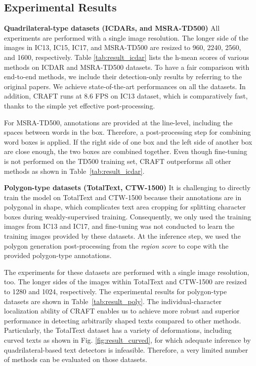\documentclass[10pt,twocolumn,letterpaper]{article}
\begin{document}
\subsection{Experimental Results}

\noindent\textbf{Quadrilateral-type datasets (ICDARs, and MSRA-TD500)} 
All experiments are performed with a single image resolution. The longer side of the images in IC13, IC15, IC17, and MSRA-TD500 are resized to 960, 2240, 2560, and 1600, respectively.
Table \ref{tab:result_icdar} lists the h-mean scores of various methods on ICDAR and MSRA-TD500 datasets.
To have a fair comparison with end-to-end methods, we include their detection-only results by referring to the original papers.
We achieve state-of-the-art performances on all the datasets. In addition, CRAFT runs at 8.6 FPS on IC13 dataset, which is comparatively fast, thanks to the simple yet effective post-processing.






For MSRA-TD500, annotations are provided at the line-level, including the spaces between words in the box. Therefore, a post-processing step for combining word boxes is applied. If the right side of one box and the left side of another box are close enough, the two boxes are combined together. Even though fine-tuning is not performed on the TD500 training set, CRAFT outperforms all other methods as shown in Table~\ref{tab:result_icdar}. 




\noindent\textbf{Polygon-type datasets (TotalText, CTW-1500)} 
It is challenging to directly train the model on TotalText and CTW-1500 because their annotations are in polygonal in shape, which complicates text area cropping for splitting character boxes during weakly-supervised training.
Consequently, we only used the training images from IC13 and IC17, and fine-tuning was not conducted to learn the training images provided by these datasets. At the inference step, we used the polygon generation post-processing from the \textit{region score} to cope with the provided polygon-type annotations.


The experiments for these datasets are performed with a single image resolution, too. The longer sides of the images within TotalText and CTW-1500 are resized to 1280 and 1024, respectively.
The experimental results for polygon-type datasets are shown in Table~\ref{tab:result_poly}. The individual-character localization ability of CRAFT enables us to achieve more robust and superior performance in detecting arbitrarily shaped texts compared to other methods. Particularly, the TotalText dataset has a variety of deformations, including curved texts as shown in Fig. \ref{fig:result_curved}, for which adequate inference by quadrilateral-based text detectors is infeasible. Therefore, a very limited number of methods can be evaluated on those datasets.
\end{document}
